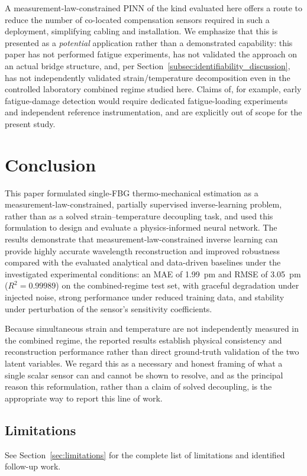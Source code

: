 \documentclass[journal,twoside,web]{ieeecolor}
\begin{document}
A measurement-law-constrained PINN of the kind evaluated here offers a
route to reduce the number of co-located compensation sensors required in
such a deployment, simplifying cabling and installation. We emphasize that
this is presented as a \emph{potential} application rather than a
demonstrated capability: this paper has not performed fatigue experiments,
has not validated the approach on an actual bridge structure, and, per
Section~\ref{subsec:identifiability_discussion}, has not independently
validated strain/temperature decomposition even in the controlled
laboratory combined regime studied here. Claims of, for example, early
fatigue-damage detection would require dedicated fatigue-loading experiments
and independent reference instrumentation, and are explicitly out of scope
for the present study.


\section{Conclusion}
\label{sec:conclusion}

This paper formulated single-FBG thermo-mechanical estimation as a
measurement-law-constrained, partially supervised inverse-learning problem,
rather than as a solved strain--temperature decoupling task, and used this
formulation to design and evaluate a physics-informed neural network. The
results demonstrate that measurement-law-constrained inverse learning can
provide highly accurate wavelength reconstruction and improved robustness
compared with the evaluated analytical and data-driven baselines under the
investigated experimental conditions: an MAE of 1.99~pm and RMSE of 3.05~pm
($R^2=0.99989$) on the combined-regime test set, with graceful degradation
under injected noise, strong performance under reduced training data, and
stability under perturbation of the sensor's sensitivity coefficients.

Because simultaneous strain and temperature are not independently measured
in the combined regime, the reported results establish physical consistency
and reconstruction performance rather than direct ground-truth validation of
the two latent variables. We regard this as a necessary and honest framing
of what a single scalar sensor can and cannot be shown to resolve, and as
the principal reason this reformulation, rather than a claim of solved
decoupling, is the appropriate way to report this line of work.

\subsection*{Limitations}
See Section~\ref{sec:limitations} for the complete list of limitations and
identified follow-up work.
\end{document}

